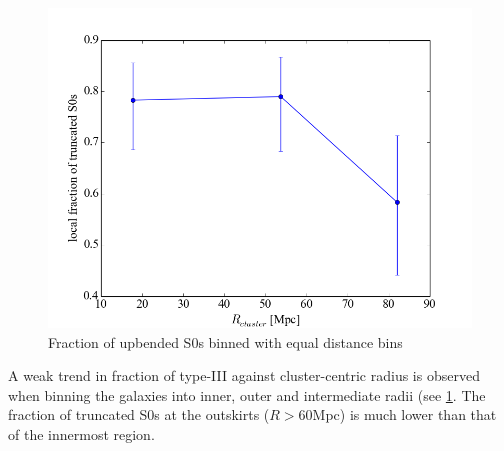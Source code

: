 \begin{figure}[h]
	\centering
	\includegraphics[scale=0.5]{figs/fraction_vs_cluster_radius}
	\caption{Fraction of upbended S0s binned with equal distance bins}
	\label{fraction vs dist}
\end{figure}

A weak trend in fraction of type-III against cluster-centric radius is observed when binning the galaxies into inner, outer and intermediate radii (see \ref{fraction vs dist}. The fraction of truncated S0s at the outskirts ($R > 60 $Mpc) is much lower than that of the innermost region.

